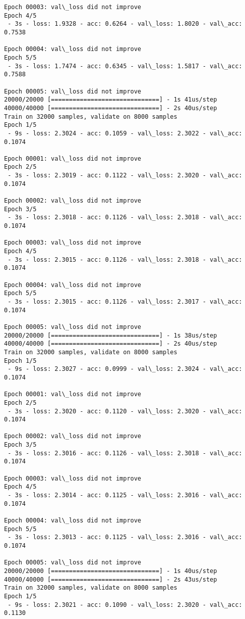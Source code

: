 \documentclass[11pt]{article}
\begin{document}
\begin{Verbatim}[commandchars=\\\{\}]
Epoch 00003: val\_loss did not improve
Epoch 4/5
 - 3s - loss: 1.9328 - acc: 0.6264 - val\_loss: 1.8020 - val\_acc: 0.7538

Epoch 00004: val\_loss did not improve
Epoch 5/5
 - 3s - loss: 1.7474 - acc: 0.6345 - val\_loss: 1.5817 - val\_acc: 0.7588

Epoch 00005: val\_loss did not improve
20000/20000 [==============================] - 1s 41us/step
40000/40000 [==============================] - 2s 40us/step
Train on 32000 samples, validate on 8000 samples
Epoch 1/5
 - 9s - loss: 2.3024 - acc: 0.1059 - val\_loss: 2.3022 - val\_acc: 0.1074

Epoch 00001: val\_loss did not improve
Epoch 2/5
 - 3s - loss: 2.3019 - acc: 0.1122 - val\_loss: 2.3020 - val\_acc: 0.1074

Epoch 00002: val\_loss did not improve
Epoch 3/5
 - 3s - loss: 2.3018 - acc: 0.1126 - val\_loss: 2.3018 - val\_acc: 0.1074

Epoch 00003: val\_loss did not improve
Epoch 4/5
 - 3s - loss: 2.3015 - acc: 0.1126 - val\_loss: 2.3018 - val\_acc: 0.1074

Epoch 00004: val\_loss did not improve
Epoch 5/5
 - 3s - loss: 2.3015 - acc: 0.1126 - val\_loss: 2.3017 - val\_acc: 0.1074

Epoch 00005: val\_loss did not improve
20000/20000 [==============================] - 1s 38us/step
40000/40000 [==============================] - 2s 40us/step
Train on 32000 samples, validate on 8000 samples
Epoch 1/5
 - 9s - loss: 2.3027 - acc: 0.0999 - val\_loss: 2.3024 - val\_acc: 0.1074

Epoch 00001: val\_loss did not improve
Epoch 2/5
 - 3s - loss: 2.3020 - acc: 0.1120 - val\_loss: 2.3020 - val\_acc: 0.1074

Epoch 00002: val\_loss did not improve
Epoch 3/5
 - 3s - loss: 2.3016 - acc: 0.1126 - val\_loss: 2.3018 - val\_acc: 0.1074

Epoch 00003: val\_loss did not improve
Epoch 4/5
 - 3s - loss: 2.3014 - acc: 0.1125 - val\_loss: 2.3016 - val\_acc: 0.1074

Epoch 00004: val\_loss did not improve
Epoch 5/5
 - 3s - loss: 2.3013 - acc: 0.1125 - val\_loss: 2.3016 - val\_acc: 0.1074

Epoch 00005: val\_loss did not improve
20000/20000 [==============================] - 1s 40us/step
40000/40000 [==============================] - 2s 43us/step
Train on 32000 samples, validate on 8000 samples
Epoch 1/5
 - 9s - loss: 2.3021 - acc: 0.1090 - val\_loss: 2.3020 - val\_acc: 0.1130


\end{Verbatim}
\end{document}
